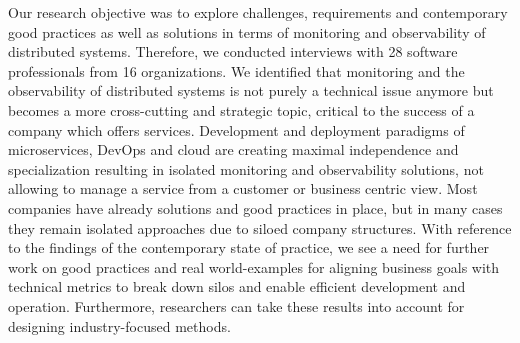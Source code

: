 \documentclass[runningheads]{llncs}
\begin{document}
Our research objective was to explore challenges, requirements and contemporary good practices as well as solutions in terms of monitoring and observability of distributed systems. Therefore, we conducted interviews with 28 software professionals from 16 organizations.
We identified that monitoring and the observability of distributed systems is not purely a technical issue anymore but becomes a more cross-cutting and strategic topic, critical to the success of a company which offers services. Development and deployment paradigms of microservices, DevOps and cloud are creating maximal independence and specialization resulting in isolated monitoring and observability solutions, not allowing to manage a service from a customer or business centric view. Most companies have already solutions and good practices in place, but in many cases they remain isolated approaches due to siloed company structures.
With reference to the findings of the contemporary state of practice, we see a need for further work on good practices and real world-examples for aligning business goals with technical metrics to break down silos and enable efficient development and operation. Furthermore, researchers can take these results into account for designing industry-focused methods.



%
%
%
% 
% 
%



\end{document}
